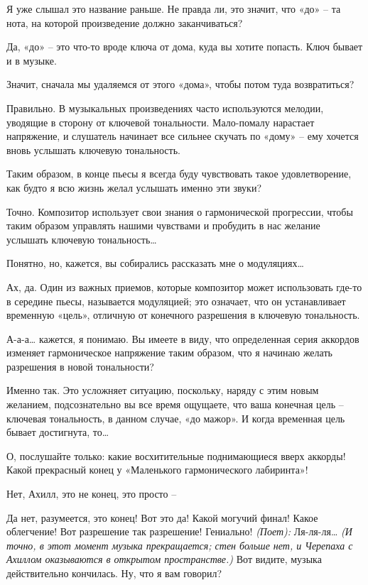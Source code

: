 \documentclass[../main.tex]{subfiles}
\begin{document}
\begin{Dialogue}
\begin{sublevel}
\begin{sublevel}
\begin{sublevel}
 Я уже слышал это название раньше. Не правда ли, это значит, что «до» \--- та нота, на которой произведение должно заканчиваться?

 Да, «до» \--- это что-то вроде ключа от дома, куда вы хотите попасть. Ключ бывает и в музыке.

 Значит, сначала мы удаляемся от этого «дома», чтобы потом туда возвратиться?

 Правильно. В музыкальных произведениях часто используются мелодии, уводящие в сторону от ключевой тональности. Мало-помалу нарастает напряжение, и слушатель начинает все сильнее скучать по «дому» \--- ему хочется вновь услышать ключевую тональность.

 Таким образом, в конце пьесы я всегда буду чувствовать такое удовлетворение, как будто я всю жизнь желал услышать именно эти звуки?

 Точно. Композитор использует свои знания о гармонической прогрессии, чтобы таким образом управлять нашими чувствами и пробудить в нас желание услышать ключевую тональность\ldots{}

 Понятно, но, кажется, вы собирались рассказать мне о модуляциях\ldots{}

 Ах, да. Один из важных приемов, которые композитор может использовать где-то в середине пьесы, называется модуляцией; это означает, что он устанавливает временную «цель», отличную от конечного разрешения в ключевую тональность.

 А-а-а\ldots{} кажется, я понимаю. Вы имеете в виду, что определенная серия аккордов изменяет гармоническое напряжение таким образом, что я начинаю желать разрешения в новой тональности?

 Именно так. Это усложняет ситуацию, поскольку, наряду с этим новым желанием, подсознательно вы все время ощущаете, что ваша конечная цель \--- ключевая тональность, в данном случае, «до мажор». И когда временная цель бывает достигнута, то\ldots{}

 О, послушайте только: какие восхитительные поднимающиеся вверх аккорды! Какой прекрасный конец у «Маленького гармонического лабиринта»!

 Нет, Ахилл, это не конец, это просто \---

 Да нет, разумеется, это конец! Вот это да! Какой могучий финал! Какое облегчение! Вот разрешение так разрешение! Гениально! \emph{(Поет):} Ля-ля-ля\ldots{} \emph{(И точно, в этот момент музыка прекращается; стен больше нет, и Черепаха с Ахиллом оказываются в открытом пространстве.)} Вот видите, музыка действительно кончилась. Ну, что я вам говорил?


\end{sublevel}
\end{sublevel}
\end{sublevel}
\end{Dialogue}
\end{document}
